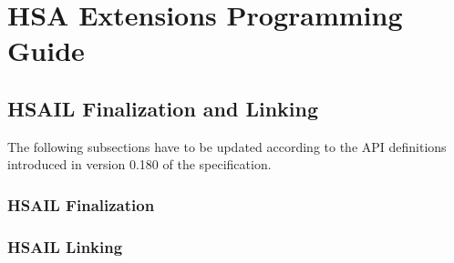 \documentclass[draft]{book}
\begin{document}

%


\chapter{HSA Extensions Programming Guide}

\section{HSAIL Finalization and Linking}
\label{finalizerchapter} \hypertarget{finalizerchapter}{}

The following subsections have to be updated according to the API definitions
introduced in version 0.180 of the specification.


\hypertarget{finalizer}{}\subsection{HSAIL Finalization}\label{finalizer}

\hypertarget{linking}{}\subsection{HSAIL Linking}\label{linking}



\end{document}
